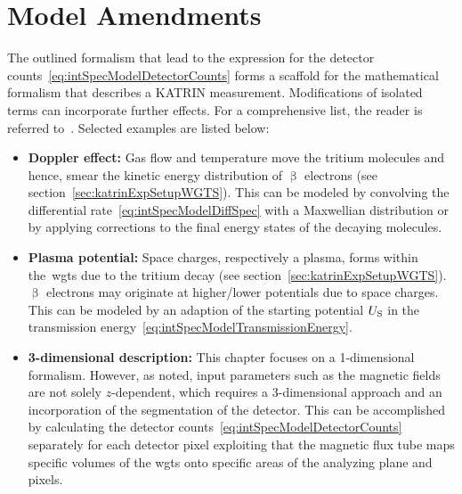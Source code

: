 \section{Model Amendments}
The outlined formalism that lead to the expression for the detector counts~\eqref{eq:intSpecModelDetectorCounts} forms a scaffold for the mathematical formalism that describes a KATRIN measurement. Modifications of isolated terms can incorporate further effects. For a comprehensive list, the reader is referred to~\cite{Kleesiek2019}. Selected examples are listed below:
\begin{itemize}
	\item \textbf{Doppler effect:} Gas flow and temperature move the tritium molecules and hence, smear the kinetic energy distribution of $\upbeta$ electrons (see section~\ref{sec:katrinExpSetupWGTS}). This can be modeled by convolving the differential rate~\eqref{eq:intSpecModelDiffSpec} with a Maxwellian distribution or by applying corrections to the final energy states of the decaying molecules.
	\item \textbf{Plasma potential:} Space charges, respectively a plasma, forms within the~\gls{wgts} due to the tritium decay (see section~\ref{sec:katrinExpSetupWGTS}). $\upbeta$ electrons may originate at higher/lower potentials due to space charges. This can be modeled by an adaption of the starting potential $U_\mathrm{S}$ in the transmission energy~\eqref{eq:intSpecModelTransmissionEnergy}.
	\item \textbf{3-dimensional description:} This chapter focuses on a 1-dimensional formalism. However, as noted, input parameters such as the magnetic fields are not solely \mbox{$z$-dependent}, which requires a 3-dimensional approach and an incorporation of the segmentation of the detector. This can be accomplished by calculating the detector counts~\eqref{eq:intSpecModelDetectorCounts} separately for each detector pixel exploiting that the magnetic flux tube maps specific volumes of the \gls{wgts} onto specific areas of the analyzing plane and pixels.
\end{itemize}

